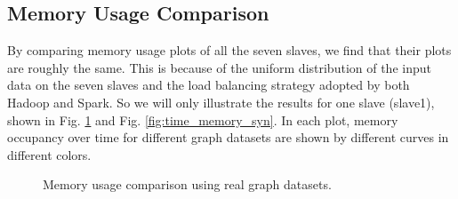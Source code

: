 \documentclass[10pt,conference,compsocconf]{IEEEtran}
\begin{document}
\subsection{Memory Usage Comparison}

 By comparing memory usage plots of all the seven slaves, we find that their plots are roughly the same. This is because of the uniform distribution of the input data on the seven slaves and the load balancing strategy adopted by both Hadoop and Spark. So we will only illustrate the results for one slave (slave1), shown in Fig. \ref{fig:time_memory_real} and Fig. \ref{fig:time_memory_syn}. In each plot, memory occupancy over time for different graph datasets are shown by different curves in different colors.
 
\begin{figure}[!t]
  \centering
  \caption{Memory usage comparison using real graph datasets.}
  \label{fig:time_memory_real} 
\end{figure}
\end{document}

